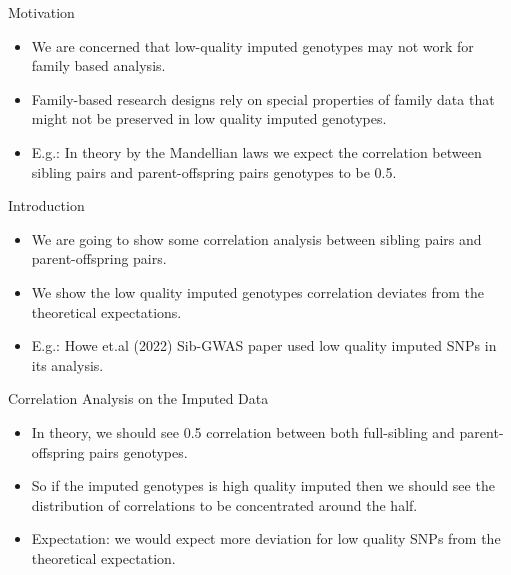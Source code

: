 \documentclass{beamer}
\begin{document}
\begin{frame}{Motivation}
      \begin{itemize}
            \item We are concerned that low-quality imputed genotypes may not work for family based analysis. %
            \item Family-based research designs rely on special properties of family data that might not be preserved in low quality imputed genotypes.
            \item E.g.: In theory by the Mandellian laws we expect the correlation between sibling pairs and parent-offspring pairs genotypes to be 0.5.
      \end{itemize}
\end{frame}

\begin{frame}{Introduction}
      \begin{itemize}
            \item We are going to show some correlation analysis between sibling pairs and parent-offspring pairs.
            \item We show the low quality imputed genotypes correlation deviates from the theoretical expectations.
            \item E.g.: Howe et.al (2022) Sib-GWAS paper used low quality imputed SNPs in its analysis.
      \end{itemize}
\end{frame}

\begin{frame}{Correlation Analysis on the Imputed Data}
      \begin{itemize}
          \item In theory, we should see 0.5 correlation between both full-sibling and parent-offspring pairs genotypes.
          \item So if the imputed genotypes is high quality imputed then we should see the distribution of correlations to be concentrated around the half.
          \item Expectation: we would expect more deviation for low quality SNPs from the theoretical expectation.
      \end{itemize}
\end{frame}
\end{document}
